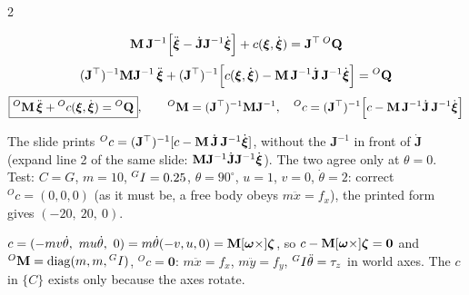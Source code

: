 \begin{multicols}{2}
\begin{fbx}[Plug into $\mathbf M\dot{\wEz}+c=\wEQC$ \pg{34}]
\[\mathbf M\,\mathbf J^{-1}\Big[\ddot{\boldsymbol\xi}-\dot{\mathbf J}\mathbf J^{-1}\dot{\boldsymbol\xi}\Big]+c(\boldsymbol\xi,\dot{\boldsymbol\xi})=\mathbf J^\top\,{}^{O}\mathbf Q\]
\[(\mathbf J^\top)^{-1}\mathbf M\mathbf J^{-1}\,\ddot{\boldsymbol\xi}+(\mathbf J^\top)^{-1}\Big[c(\boldsymbol\xi,\dot{\boldsymbol\xi})-\mathbf M\,\mathbf J^{-1}\dot{\mathbf J}\,\mathbf J^{-1}\dot{\boldsymbol\xi}\Big]={}^{O}\mathbf Q\]
\[\boxed{{}^O\mathbf M\,\ddot{\boldsymbol\xi}+{}^Oc(\boldsymbol\xi,\dot{\boldsymbol\xi})={}^O\mathbf Q},\qquad {}^O\mathbf M=(\mathbf J^\top)^{-1}\mathbf M\mathbf J^{-1},\quad {}^Oc=(\mathbf J^\top)^{-1}\Big[c-\mathbf M\,\mathbf J^{-1}\dot{\mathbf J}\,\mathbf J^{-1}\dot{\boldsymbol\xi}\Big]\]
\end{fbx}
\begin{slideerr}
The slide prints ${}^Oc=(\mathbf J^\top)^{-1}[c-\mathbf M\,\dot{\mathbf J}\,\mathbf J^{-1}\dot{\boldsymbol\xi}]$, without the $\mathbf J^{-1}$ in front of $\dot{\mathbf J}$ (expand line 2 of the same slide: $\mathbf M\mathbf J^{-1}\dot{\mathbf J}\mathbf J^{-1}\dot{\boldsymbol\xi}$). The two agree only at $\theta=0$. Test: $C=G$, $m=10$, ${}^{G}I=0.25$, $\theta=90^\circ$, $u=1$, $v=0$, $\dot\theta=2$: correct ${}^Oc=(0,0,0)$ (as it must be, a free body obeys $m\ddot x=f_x$), the printed form gives $(-20,\ 20,\ 0)$. \chk
\end{slideerr}
\begin{worked}[$C=G$: the velocity terms vanish in world axes]
$c=(-mv\dot\theta,\ mu\dot\theta,\ 0)=m\dot\theta(-v,u,0)=\mathbf M[\boldsymbol\omega\times]\wEz$, so $c-\mathbf M[\boldsymbol\omega\times]\boldsymbol\zeta=\mathbf 0$ and ${}^O\mathbf M=\operatorname{diag}(m,m,{}^{G}I)$, ${}^Oc=\mathbf 0$: $m\ddot x=f_x$, $m\ddot y=f_y$, ${}^{G}I\ddot\theta=\tau_z$ in world axes. The $c$ in $\{C\}$ exists only because the axes rotate. \chk
\end{worked}
\begin{center}\small
\begin{tabularx}{\linewidth}{@{}>{\raggedright\arraybackslash}p{0.2\linewidth}>{\raggedright\arraybackslash}X>{\raggedright\arraybackslash}X@{}}\toprule

\end{tabularx}
\end{center}
\end{multicols}
